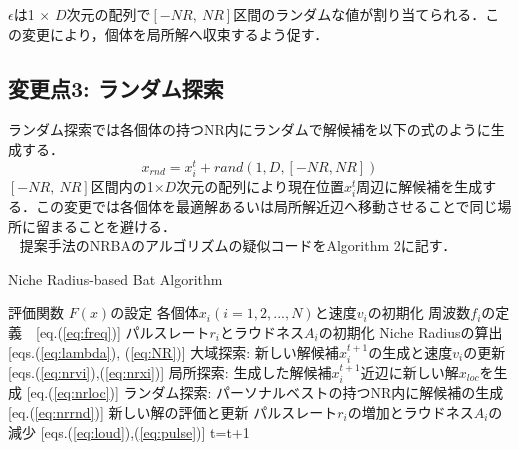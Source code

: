 \documentclass{jarticle}
\begin{document}
$\epsilon$は1 $\times$ $D$次元の配列で$[-NR, \ NR]$区間のランダムな値が割り当てられる．この変更により，個体を局所解へ収束するよう促す．
\subsection{変更点3: ランダム探索}
ランダム探索では各個体の持つNR内にランダムで解候補を以下の式のように生成する．
\begin{equation}
\label{eq:nrrnd}
x_{rnd}=x_i^t + rand(1,D,[-NR, NR])
\end{equation}
$[-NR, \ NR]$区間内の1×$D$次元の配列により現在位置$x_i^t$周辺に解候補を生成する．この変更では各個体を最適解あるいは局所解近辺へ移動させることで同じ場所に留まることを避ける． \\ \
提案手法のNRBAのアルゴリズムの疑似コードをAlgorithm 2に記す．

\begin{algorithm}[H]
\caption{Niche Radius-based Bat Algorithm}
\label{code:nrba}
\begin{algorithmic}[2]
\REQUIRE 評価関数 $F(x)$の設定
\STATE 各個体$x_i(i=1,2,...,N)$と速度$v_i$の初期化
\STATE 周波数$f_i$の定義　[eq.(\ref{eq:freq})]
\STATE パルスレート$r_i$とラウドネス$A_i$の初期化
\STATE Niche Radiusの算出 [eqs.(\ref{eq:lambda}), (\ref{eq:NR})]
\STATE 大域探索: 新しい解候補$x_i^{t+1}$の生成と速度$v_i$の更新 [eqs.(\ref{eq:nrvi}),(\ref{eq:nrxi})]
\ENDIF
{}
\STATE 局所探索: 生成した解候補$x_i^{t+1}$近辺に新しい解$x_{loc}$を生成 [eq.(\ref{eq:nrloc})]
\ENDIF
\STATE ランダム探索: パーソナルベストの持つNR内に解候補の生成 [eq.(\ref{eq:nrrnd})]
\STATE 新しい解の評価と更新
\STATE パルスレート$r_i$の増加とラウドネス$A_i$の減少 [eqs.(\ref{eq:loud}),(\ref{eq:pulse})]
\ENDIF
\ENDFOR
\STATE t=t+1
\ENDWHILE
\end{algorithmic}
\end{algorithm}


\end{document}

